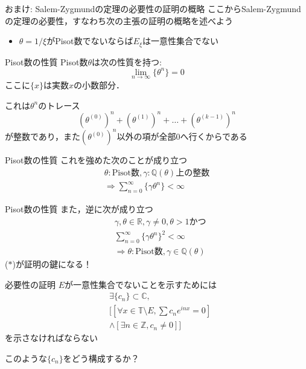 \documentclass[dvipdfmx,17pt]{beamer}
\theoremstyle{plain}
\newcommand{\Z}{\mathbb{Z}}
\newcommand{\Q}{\mathbb{Q}}
\newcommand{\R}{\mathbb{R}}
\newcommand{\C}{\mathbb{C}}
\begin{document}
\begin{frame}{おまけ: Salem-Zygmundの定理の必要性の証明の概略}
ここからSalem-Zygmundの定理の必要性，すなわち次の主張の証明の概略を述べよう

\begin{itemize}
\item $\theta=1/\xi$がPisot数でないならば$E_\xi$は一意性集合でない
\end{itemize}

\end{frame}


\begin{frame}{Pisot数の性質}
Pisot数$\theta$は次の性質を持つ:
\[\lim_{n\to\infty} \{\theta^n\} = 0\]
ここに$\{x\}$は実数$x$の小数部分．

\vspace{0.5cm}
{\small
これは$\theta^n$のトレース
\[ (\theta^{(0)})^n + (\theta^{(1)})^n + \dots + (\theta^{(k-1)})^n\]
が整数であり，また$(\theta^{(0)})^n$以外の項が全部$0$へ行くからである
}
\end{frame}

\begin{frame}{Pisot数の性質}
これを強めた次のことが成り立つ
\begin{align*}
\theta: \text{Pisot数}, \gamma: \Q(\theta)\text{上の整数} \\
 \Rightarrow \sum_{n=0}^\infty \{\gamma \theta^n\}<\infty
\end{align*}
\end{frame}

\begin{frame}{Pisot数の性質}
また，逆に次が成り立つ
\begin{align*}
& \gamma, \theta \in \R, \gamma \ne 0, \theta> 1 \text{かつ} \\
& \sum_{n=0}^\infty \{\gamma \theta^n\}^2<\infty \\
& \Rightarrow  \theta: \text{Pisot数}, \gamma \in \Q(\theta) \tag{$\ast$}
\end{align*}
($\ast$)が証明の鍵になる！
\end{frame}

\begin{frame}{必要性の証明}
$E$が一意性集合でないことを示すためには
\begin{align*}
& \exists \{c_n\} \subset \C, \\
& [[\forall x \in \mathbb{T} \setminus E, \sum c_n e^{inx} = 0] \\
& \land [\exists n \in \Z, c_n \ne 0]]
\end{align*}
を示さなければならない

このような$\{c_n\}$をどう構成するか？
\end{frame}
\end{document}
